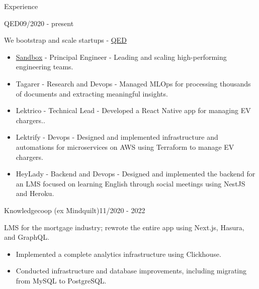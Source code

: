 \documentclass{resume}
\begin{document}
\begin{rSection}{Experience}
    \begin{rSubsection}{QED}{09/2020 - present}{}{}
        \item We bootstrap and scale startups - \href{https://qed.builders}{QED}
        \begin{itemize}
            \setlength\itemsep{-0.3em}
	    \item \href{https://www.sandbox.game/en/}{Sandbox} - Principal Engineer - Leading and scaling high-performing engineering teams.
            \item Tagarer - Research and Devops - Managed MLOps for processing thousands of documents and extracting meaningful insights.
            \item Lektrico - Technical Lead - Developed a React Native app for managing EV chargers..
            \item Lektrify - Devops - Designed and implemented infrastructure and automations for microservices on AWS using Terraform to manage EV chargers.
            \item HeyLady - Backend and Devops - Designed and implemented the backend for an LMS focused on learning English through social meetings using NestJS and Heroku.
        \end{itemize}
    \end{rSubsection}

    \begin{rSubsection}{Knowledgecoop (ex Mindquilt)}{11/2020 - 2022}{}{}
        \item LMS for the mortgage industry; rewrote the entire app using Next.js, Hasura, and GraphQL.
        \begin{itemize}
            \setlength\itemsep{-0.3em}
            \item Implemented a complete analytics infrastructure using Clickhouse.
            \item Conducted infrastructure and database improvements, including migrating from MySQL to PostgreSQL.
        \end{itemize}
    \end{rSubsection}


\end{rSection}
\end{document}
